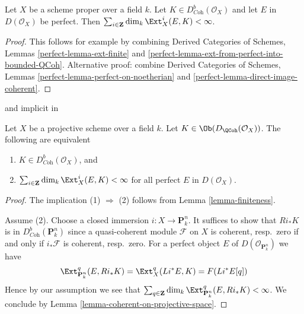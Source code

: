 \begin{lemma}
\label{lemma-finiteness}
Let $X$ be a scheme proper over a field $k$. Let
$K \in D^b_{\textit{Coh}}(\mathcal{O}_X)$ and let $E$ in $D(\mathcal{O}_X)$
be perfect. Then
$\sum_{i \in \mathbf{Z}} \dim_k \Ext^i_X(E, K) < \infty$.
\end{lemma}

\begin{proof}
This follows for example by combining
Derived Categories of Schemes, Lemmas \ref{perfect-lemma-ext-finite} and
\ref{perfect-lemma-ext-from-perfect-into-bounded-QCoh}.
Alternative proof: combine
Derived Categories of Schemes, Lemmas
\ref{perfect-lemma-perfect-on-noetherian} and
\ref{perfect-lemma-direct-image-coherent}.
\end{proof}

\begin{lemma}
\label{lemma-characterize-dbcoh-projective}
\begin{reference}
\cite[Lemma 7.46]{Rouqier-dimensions} and implicit in
\cite[Theorem A.1]{BvdB}
\end{reference}
Let $X$ be a projective scheme over a field $k$. Let
$K \in \Ob(D_\QCoh(\mathcal{O}_X))$. The following are equivalent
\begin{enumerate}
\item $K \in D^b_{\textit{Coh}}(\mathcal{O}_X)$, and
\item $\sum_{i \in \mathbf{Z}} \dim_k \Ext^i_X(E, K) < \infty$
for all perfect $E$ in $D(\mathcal{O}_X)$.
\end{enumerate}
\end{lemma}

\begin{proof}
The implication (1) $\Rightarrow$ (2) follows from
Lemma \ref{lemma-finiteness}.

\medskip\noindent
Assume (2).
Choose a closed immersion $i : X \to \mathbf{P}^n_k$. It suffices to show
that $Ri_*K$ is in $D^b_{\textit{Coh}}(\mathbf{P}^n_k)$ since a quasi-coherent
module $\mathcal{F}$ on $X$ is coherent, resp.\ zero if and only if
$i_*\mathcal{F}$ is coherent, resp.\ zero. For a perfect object $E$
of $D(\mathcal{O}_{\mathbf{P}^n_k})$ we have
$$
\Ext^q_{\mathbf{P}^n_k}(E, Ri_*K) = \Ext^q_X(Li^*E, K) = F(Li^*E[q])
$$
Hence by our assumption we see that
$\sum_{q \in \mathbf{Z}} \dim_k \Ext^q_{\mathbf{P}^n_k}(E, Ri_*K) < \infty$.
We conclude by Lemma \ref{lemma-coherent-on-projective-space}.
\end{proof}





